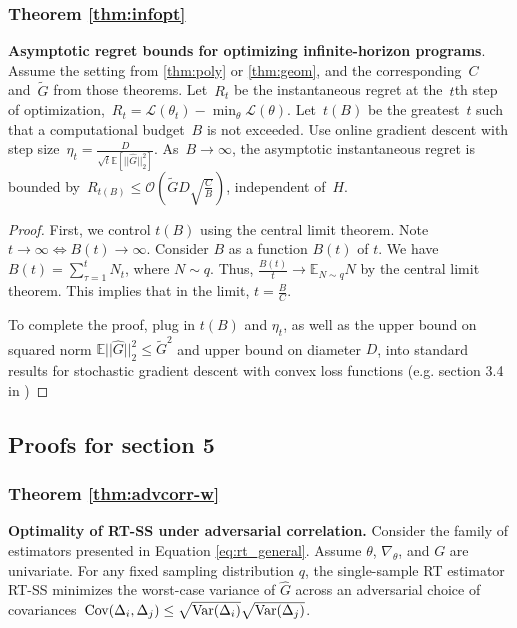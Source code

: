 \subsubsection{Theorem \ref{thm:infopt}}
\textbf{Asymptotic regret bounds for optimizing infinite-horizon programs}.
Assume the setting from \ref{thm:poly} or \ref{thm:geom}, and the corresponding~$C$ and~$\tilde{G}$ from those theorems.
Let~$R_t$ be the instantaneous regret at the~$t$th step of optimization,~${R_t = \mathcal{L}(\theta_t) - \min_\theta \mathcal{L} (\theta)}$.
Let~$t(B)$ be the greatest~$t$ such that a computational budget~$B$ is not exceeded.
Use online gradient descent with step size~${\eta_t = \frac{D}{\sqrt{t} \mathbb{E}[||\hat{G}||_2^2]}}$.
As~${B \to \infty}$, the asymptotic instantaneous regret is bounded by~${R_{t(B)} \leq \mathcal{O} (\tilde{G} D \sqrt{\frac{C}{B}})}$, independent of~$H$.
\begin{proof}
First, we control $t(B)$ using the central limit theorem.
Note $t \to \infty \iff B(t) \to \infty$. Consider $B$ as a function $B(t)$
of $t$. We have $B(t) = \sum_{\tau=1}^t N_t$, where $N \sim q$. Thus,
$\frac{B(t)}{t} \to \mathbb{E}_{N \sim q} N$ by the central limit theorem. This
implies that in the limit, $t = \frac{B}{C}$.

To complete the proof, plug in $t(B)$ and $\eta_t$, as well as the upper bound
on squared norm $\mathbb{E}||\hat{G}||_2^2 \leq \tilde{G}^2$ and upper bound
on diameter $D$, into standard results for stochastic gradient descent with
convex loss functions (e.g. section 3.4 in \cite{hazan2016introduction})
\end{proof}

\subsection{Proofs for section 5}

\subsubsection{Theorem \ref{thm:advcorr-w}}
\textbf{Optimality of RT-SS under adversarial correlation.}
Consider the family of estimators presented in Equation  \ref{eq:rt_general}.
Assume $\theta$, $\nabla_\theta$, and $G$ are univariate.
For any fixed sampling distribution $q$, the single-sample RT estimator RT-SS minimizes the worst-case variance of $\hat{G}$ across an adversarial choice of covariances~${\mathrm{Cov}(\Delta_i, \Delta_j) \leq \sqrt{\mathrm{Var}(\Delta_i)} \sqrt{\mathrm{Var}(\Delta_j)}}$.

